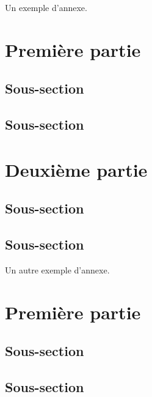 \documentclass[11pt,a4paper,french]{article}
\begin{document}
\newpage
\begin{IMTAannexes}
	
	
\label{sec:S_ANN_EX}

Un exemple d'annexe.
\section{Première partie}


\subsection{Sous-section}
\subsection{Sous-section}

\section{Deuxième partie}

\subsection{Sous-section}
\subsection{Sous-section}


\label{sec:S_ANN_EX2}

Un autre exemple d'annexe.
\section{Première partie}


\subsection{Sous-section}
\subsection{Sous-section}


\end{IMTAannexes}
\end{document}
